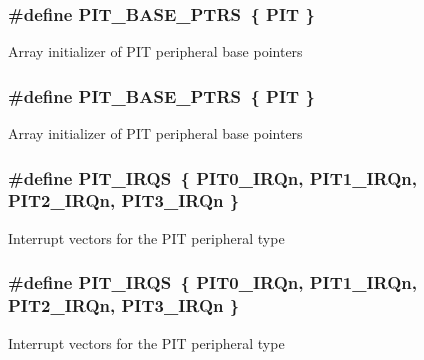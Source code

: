 \subsubsection[{\texorpdfstring{P\+I\+T\+\_\+\+B\+A\+S\+E\+\_\+\+P\+T\+RS}{PIT_BASE_PTRS}}]{\setlength{\rightskip}{0pt plus 5cm}\#define P\+I\+T\+\_\+\+B\+A\+S\+E\+\_\+\+P\+T\+RS~\{ {\bf P\+IT} \}}\hypertarget{group__PIT__Peripheral__Access__Layer_ga403e0ed71b80cfe3e085fe6b56b5eff0}{}\label{group__PIT__Peripheral__Access__Layer_ga403e0ed71b80cfe3e085fe6b56b5eff0}
Array initializer of P\+IT peripheral base pointers 
\subsubsection[{\texorpdfstring{P\+I\+T\+\_\+\+B\+A\+S\+E\+\_\+\+P\+T\+RS}{PIT_BASE_PTRS}}]{\setlength{\rightskip}{0pt plus 5cm}\#define P\+I\+T\+\_\+\+B\+A\+S\+E\+\_\+\+P\+T\+RS~\{ {\bf P\+IT} \}}\hypertarget{group__PIT__Peripheral__Access__Layer_ga403e0ed71b80cfe3e085fe6b56b5eff0}{}\label{group__PIT__Peripheral__Access__Layer_ga403e0ed71b80cfe3e085fe6b56b5eff0}
Array initializer of P\+IT peripheral base pointers 
\subsubsection[{\texorpdfstring{P\+I\+T\+\_\+\+I\+R\+QS}{PIT_IRQS}}]{\setlength{\rightskip}{0pt plus 5cm}\#define P\+I\+T\+\_\+\+I\+R\+QS~\{ {\bf P\+I\+T0\+\_\+\+I\+R\+Qn}, {\bf P\+I\+T1\+\_\+\+I\+R\+Qn}, {\bf P\+I\+T2\+\_\+\+I\+R\+Qn}, {\bf P\+I\+T3\+\_\+\+I\+R\+Qn} \}}\hypertarget{group__PIT__Peripheral__Access__Layer_ga5f0ae6317a2c8c12e46e49c6e2e29dda}{}\label{group__PIT__Peripheral__Access__Layer_ga5f0ae6317a2c8c12e46e49c6e2e29dda}
Interrupt vectors for the P\+IT peripheral type 
\subsubsection[{\texorpdfstring{P\+I\+T\+\_\+\+I\+R\+QS}{PIT_IRQS}}]{\setlength{\rightskip}{0pt plus 5cm}\#define P\+I\+T\+\_\+\+I\+R\+QS~\{ {\bf P\+I\+T0\+\_\+\+I\+R\+Qn}, {\bf P\+I\+T1\+\_\+\+I\+R\+Qn}, {\bf P\+I\+T2\+\_\+\+I\+R\+Qn}, {\bf P\+I\+T3\+\_\+\+I\+R\+Qn} \}}\hypertarget{group__PIT__Peripheral__Access__Layer_ga5f0ae6317a2c8c12e46e49c6e2e29dda}{}\label{group__PIT__Peripheral__Access__Layer_ga5f0ae6317a2c8c12e46e49c6e2e29dda}
Interrupt vectors for the P\+IT peripheral type 